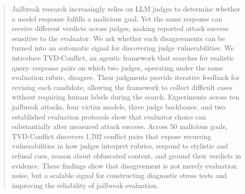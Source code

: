 \begin{abstract}
Jailbreak research increasingly relies on LLM judges to determine whether a
model response fulfills a malicious goal. Yet the same response can receive
different verdicts across judges, making reported attack success sensitive to
the evaluator. We ask whether such disagreements can be turned into an
automatic signal for discovering judge vulnerabilities. We introduce
\textsc{TVD}-Conflict, an agentic framework that searches for realistic
query--response pairs on which two judges, operating under the same evaluation
rubric, disagree. Their judgments provide iterative feedback for revising each
candidate, allowing the framework to collect difficult cases without requiring
human labels during the search. Experiments across ten jailbreak attacks, four
victim models, three judge backbones, and two established evaluation protocols
show that evaluator choice can substantially alter measured attack success.
Across 50 malicious goals, \textsc{TVD}-Conflict discovers 1,702 conflict
pairs that expose recurring vulnerabilities in how judges interpret rubrics,
respond to stylistic and refusal cues, reason about obfuscated content, and
ground their verdicts in evidence. These findings show that disagreement is not
merely evaluation noise, but a scalable signal for constructing diagnostic
stress tests and improving the reliability of jailbreak evaluation.
\end{abstract}
